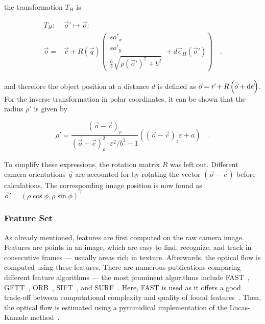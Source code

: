 the transformation $T_H$ is

\begin{equation}
  \nonumber
  \begin{aligned}
    T_H: & \vec o' \longmapsto \vec o : \\
    \vec o = & \vec c + R(\vec q)
    \left( \begin{array}{c}
             s o'_x\\
             s o'_y\\
             \frac{a}{b} \sqrt{\rho(\vec o')^2 + b^2}
           \end{array} + d \vec e_H(\vec o') \right) \quad \text{.}
    \end{aligned}
\end{equation}

and therefore the object position at a distance $d$ is defined as $\vec o = \vec r + R \left( \hat{\vec o} + {\textrm d} \vec e \right)$.
For the inverse transformation in polar coordinates, it can be shown that the radius $\rho'$ is given by

\begin{equation}
  \rho' = \frac{\left( \vec o - \vec c \right)_\rho}{\left( \vec o - \vec c \right)^2_\rho \cdot \varepsilon^2 / b^2 -1}
         \left( \left( \vec o - \vec c \right)_z \varepsilon + a \right) \quad \text{.}
\end{equation}

To simplify these expressions, the rotation matrix $R$ was left out.
Different camera orientations $\vec q$ are accounted for by rotating the vector $\left( \vec o - \vec c \right)$ before calculations.
The corresponding image position is now found as $\vec o' = \left( \rho \cos \phi, \rho \sin \phi \right)^\intercal$.





\subsubsection{Feature Set}

As already mentioned, features are first computed on the raw camera image.
Features are points in an image, which are easy to find, recognize, and track in consecutive frames --- usually areas rich in texture.
Afterwards, the optical flow is computed using these features.
There are numerous publications comparing different feature algorithms --- the most prominent algorithms include FAST~\cite{Rosten2006}, GFTT~\cite{shi1994}, ORB~\cite{rublee2011orb}, SIFT~\cite{lowe1999object}, and SURF~\cite{bay2006}.
Here, FAST is used as it offers a good trade-off between computational complexity and quality of found features~\cite{Elgayar2013175, Heinly2012}.
Then, the optical flow is estimated using a pyramidical implementation of the Lucas-Kanade method~\cite{bouguet2001pyramidal}.





